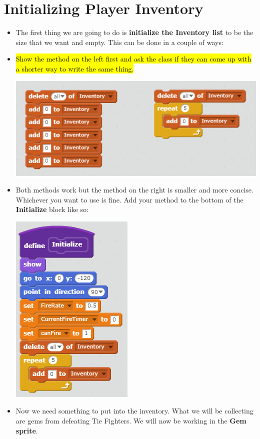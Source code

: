 \documentclass[12pt]{article}
\begin{document}
\section *{Initializing Player Inventory}
	\begin{itemize}
		\item The first thing we are going to do is \textbf{initialize the Inventory list} to be the size that we want and empty. This can be done in a couple of ways:
		\item \hl{Show the method on the left first and ask the class if they can come up with a shorter way to write the same thing.}
		\begin{center}
    		\includegraphics[scale = 0.75]{./Images/Initialize_Inventory.png}
		\end{center}

		
		\item Both methods work but the method on the right is smaller and more concise. Whichever you want to use is fine. Add your method to the bottom of the \textbf{Initialize} block like so:

		\begin{center}
    		\includegraphics[scale = 0.75]{./Images/XWing_Initialize.png}
		\end{center} 

		\item Now we need something to put into the inventory. What we will be collecting are gems from defeating Tie Fighters. We will now be working in the \textbf{Gem sprite}.
	\end{itemize}
	
\end{document}
